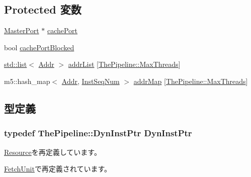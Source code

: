 \subsection*{Protected 変数}
\begin{DoxyCompactItemize}
\item 
\hyperlink{classMasterPort}{MasterPort} $\ast$ \hyperlink{classCacheUnit_a6acbf550d7553b77d4e6f42d91133da6}{cachePort}
\item 
bool \hyperlink{classCacheUnit_abe897aa45cc14999423020f95746328a}{cachePortBlocked}
\item 
\hyperlink{classstd_1_1list}{std::list}$<$ \hyperlink{base_2types_8hh_af1bb03d6a4ee096394a6749f0a169232}{Addr} $>$ \hyperlink{classCacheUnit_a66e9796fd56a3a307b1095ff8da5a4c8}{addrList} \mbox{[}\hyperlink{namespaceThePipeline_ac9c0bbe9cf27d93e08ea8ccc4096e633}{ThePipeline::MaxThreads}\mbox{]}
\item 
m5::hash\_\-map$<$ \hyperlink{base_2types_8hh_af1bb03d6a4ee096394a6749f0a169232}{Addr}, \hyperlink{inst__seq_8hh_a258d93d98edaedee089435c19ea2ea2e}{InstSeqNum} $>$ \hyperlink{classCacheUnit_a9748daf7b829518c81be2287ecbc032d}{addrMap} \mbox{[}\hyperlink{namespaceThePipeline_ac9c0bbe9cf27d93e08ea8ccc4096e633}{ThePipeline::MaxThreads}\mbox{]}
\end{DoxyCompactItemize}


\subsection{型定義}
\hypertarget{classCacheUnit_af9d0c8a46736ba6aa2d8bb94da1a5e73}{
\subsubsection[{DynInstPtr}]{\setlength{\rightskip}{0pt plus 5cm}typedef {\bf ThePipeline::DynInstPtr} {\bf DynInstPtr}}}
\label{classCacheUnit_af9d0c8a46736ba6aa2d8bb94da1a5e73}


\hyperlink{classResource_af9d0c8a46736ba6aa2d8bb94da1a5e73}{Resource}を再定義しています。

\hyperlink{classFetchUnit_af9d0c8a46736ba6aa2d8bb94da1a5e73}{FetchUnit}で再定義されています。

